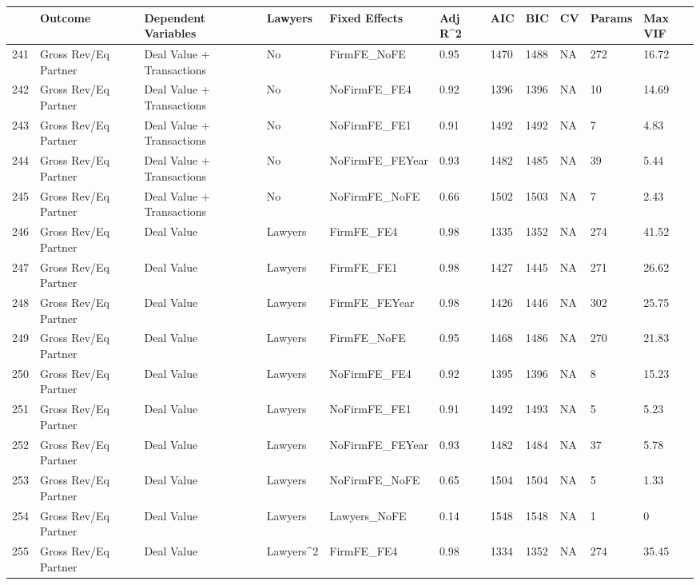 \begin{table}[ht]
\centering
\begin{tabular}{rllllllllll}
  \hline
 & Outcome & Dependent Variables & Lawyers & Fixed Effects & Adj R^2 & AIC & BIC & CV & Params & Max VIF \\ 
  \hline
241 & Gross Rev/Eq Partner & Deal Value + Transactions & No & FirmFE\_NoFE & 0.95 & 1470 & 1488 & NA & 272 & 16.72 \\ 
  242 & Gross Rev/Eq Partner & Deal Value + Transactions & No & NoFirmFE\_FE4 & 0.92 & 1396 & 1396 & NA & 10 & 14.69 \\ 
  243 & Gross Rev/Eq Partner & Deal Value + Transactions & No & NoFirmFE\_FE1 & 0.91 & 1492 & 1492 & NA & 7 & 4.83 \\ 
  244 & Gross Rev/Eq Partner & Deal Value + Transactions & No & NoFirmFE\_FEYear & 0.93 & 1482 & 1485 & NA & 39 & 5.44 \\ 
  245 & Gross Rev/Eq Partner & Deal Value + Transactions & No & NoFirmFE\_NoFE & 0.66 & 1502 & 1503 & NA & 7 & 2.43 \\ 
  246 & Gross Rev/Eq Partner & Deal Value & Lawyers & FirmFE\_FE4 & 0.98 & 1335 & 1352 & NA & 274 & 41.52 \\ 
  247 & Gross Rev/Eq Partner & Deal Value & Lawyers & FirmFE\_FE1 & 0.98 & 1427 & 1445 & NA & 271 & 26.62 \\ 
  248 & Gross Rev/Eq Partner & Deal Value & Lawyers & FirmFE\_FEYear & 0.98 & 1426 & 1446 & NA & 302 & 25.75 \\ 
  249 & Gross Rev/Eq Partner & Deal Value & Lawyers & FirmFE\_NoFE & 0.95 & 1468 & 1486 & NA & 270 & 21.83 \\ 
  250 & Gross Rev/Eq Partner & Deal Value & Lawyers & NoFirmFE\_FE4 & 0.92 & 1395 & 1396 & NA & 8 & 15.23 \\ 
  251 & Gross Rev/Eq Partner & Deal Value & Lawyers & NoFirmFE\_FE1 & 0.91 & 1492 & 1493 & NA & 5 & 5.23 \\ 
  252 & Gross Rev/Eq Partner & Deal Value & Lawyers & NoFirmFE\_FEYear & 0.93 & 1482 & 1484 & NA & 37 & 5.78 \\ 
  253 & Gross Rev/Eq Partner & Deal Value & Lawyers & NoFirmFE\_NoFE & 0.65 & 1504 & 1504 & NA & 5 & 1.33 \\ 
  254 & Gross Rev/Eq Partner & Deal Value & Lawyers & Lawyers\_NoFE & 0.14 & 1548 & 1548 & NA & 1 & 0 \\ 
  255 & Gross Rev/Eq Partner & Deal Value & Lawyers^2 & FirmFE\_FE4 & 0.98 & 1334 & 1352 & NA & 274 & 35.45 \\ 

\end{tabular}
\end{table}
